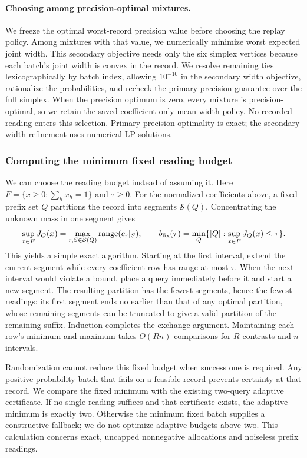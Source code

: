 \documentclass[12pt]{article}
\begin{document}
\paragraph{Choosing among precision-optimal mixtures.}
We freeze the optimal worst-record precision value before choosing the
replay policy. Among mixtures with that value, we numerically minimize
worst expected joint width. This secondary objective needs only the six
simplex vertices because each batch's joint width is convex in the record.
We resolve remaining ties lexicographically by batch index, allowing
$10^{-10}$ in the secondary width objective, rationalize the probabilities,
and recheck the primary precision guarantee over the full simplex.
When the precision optimum is zero, every mixture is precision-optimal,
so we retain the saved coefficient-only mean-width policy. No recorded
reading enters this selection. Primary precision optimality is exact;
the secondary width refinement uses numerical LP solutions.

\subsubsection{Computing the minimum fixed reading budget}
\label{sec:minimum-fixed-budget}
We can choose the reading budget instead of assuming it. Here
$F=\{x\geq0:\sum_hx_h=1\}$ and $\tau\geq0$. For the normalized
coefficients above, a fixed prefix set $Q$ partitions the record into segments
$\mathcal S(Q)$. Concentrating the unknown mass in one segment gives
\[
 \sup_{x\in F}J_Q(x)=
 \max_{r,S\in\mathcal S(Q)}\operatorname{range}(c_r|_S),\qquad
 b_{\rm fix}(\tau)=\min_Q\{|Q|:\sup_{x\in F}J_Q(x)\leq\tau\}.
\]
This yields a simple exact algorithm. Starting at the first interval, extend
the current segment while every coefficient row has range at most $\tau$.
When the next interval would violate a bound, place a query immediately
before it and start a new segment. The resulting partition has the fewest
segments, hence the fewest readings: its first segment ends no earlier than
that of any optimal partition, whose remaining segments can be truncated
to give a valid partition of the remaining suffix. Induction completes the
exchange argument. Maintaining each row's minimum and maximum takes
$O(Rn)$ comparisons for $R$ contrasts and $n$ intervals.

Randomization cannot reduce this fixed budget when success one is required.
Any positive-probability batch that fails on a feasible record prevents
certainty at that record. We compare the fixed minimum with the existing
two-query adaptive certificate. If no single reading suffices and that
certificate exists, the adaptive minimum is exactly two. Otherwise the
minimum fixed batch supplies a constructive fallback; we do not optimize
adaptive budgets above two. This calculation concerns exact, uncapped
nonnegative allocations and noiseless prefix readings.
\end{document}
